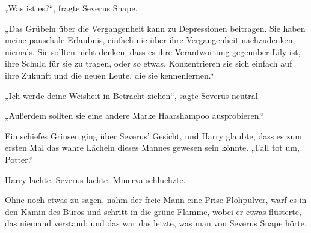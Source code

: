 „Was ist es?“, fragte Severus Snape.

„Das Grübeln über die Vergangenheit kann zu Depressionen beitragen. Sie haben meine pauschale Erlaubnis, einfach nie über ihre Vergangenheit nachzudenken, niemals. Sie sollten nicht denken, dass es ihre Verantwortung gegenüber Lily ist, ihre Schuld für sie zu tragen, oder so etwas. Konzentrieren sie sich einfach auf ihre Zukunft und die neuen Leute, die sie kennenlernen.“

„Ich werde deine Weisheit in Betracht ziehen“, sagte Severus neutral.

„Außerdem sollten sie eine andere Marke Haarshampoo ausprobieren.“

Ein schiefes Grinsen ging über Severus’ Gesicht, und Harry glaubte, dass es zum ersten Mal das wahre Lächeln dieses Mannes gewesen sein könnte.
„Fall tot um, Potter.“

Harry lachte. Severus lachte. Minerva schluchzte.

Ohne noch etwas zu sagen, nahm der freie Mann eine Prise Flohpulver, warf es in den Kamin des Büros und schritt in die grüne Flamme, wobei er etwas flüsterte, das niemand verstand; und das war das letzte, was man von Severus Snape hörte.
